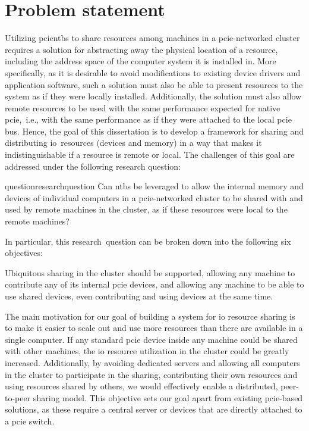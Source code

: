 \section{Problem statement}\label{sec:problem}
Utilizing \glspl{pcientb} to share resources among machines in a \gls{pcie}-networked cluster requires a solution for abstracting away the physical location of a resource, including the address space of the computer system it is installed in. 
%
More specifically, as it is desirable to avoid modifications to existing device drivers and application software, such a solution must also be able to present resources to the system as if they were locally installed.
%
Additionally, the solution must also allow remote resources to be used with the same performance expected for native \gls{pcie},~i.e., with the same performance as if they were attached to the local \gls{pcie} bus.
%
Hence, the goal of this dissertation is to develop a framework for sharing and distributing \gls{io}~resources (devices and memory) in a way that makes it indistinguishable if a resource is remote or local.
%
The challenges of this goal are addressed under the following research question: 
\begin{restatable}{question}{researchquestion}\label{question}
    Can \glspl{ntb} be leveraged to allow the internal memory and devices of individual computers in a \gls{pcie}-networked cluster to be shared with and used by remote machines in the cluster, as if these resources were local to the remote machines?
\end{restatable}
%
In particular, this research~question can be broken down into the following six objectives:


\begin{objective}\label{obj:distributed}
    Ubiquitous sharing in the cluster should be supported, allowing any machine to contribute any of its internal \gls{pcie} devices, and allowing any machine to be able to use shared devices, even contributing and using devices at the same time.
\end{objective}
The main motivation for our goal of building a system for \gls{io} resource sharing is to make it easier to scale out and use more resources than there are available in a single computer. 
If any standard \gls{pcie} device inside any machine could be shared with other machines, the \gls{io} resource utilization in the cluster could be greatly increased.
Additionally, by avoiding dedicated servers and allowing all computers in the cluster to participate in the sharing, contributing their own resources and using resources shared by others, we would effectively enable a distributed, peer-to-peer sharing model. 
This objective sets our goal apart from existing \gls{pcie}-based solutions, as these require a central server or devices that are directly attached to a \gls{pcie} switch.



